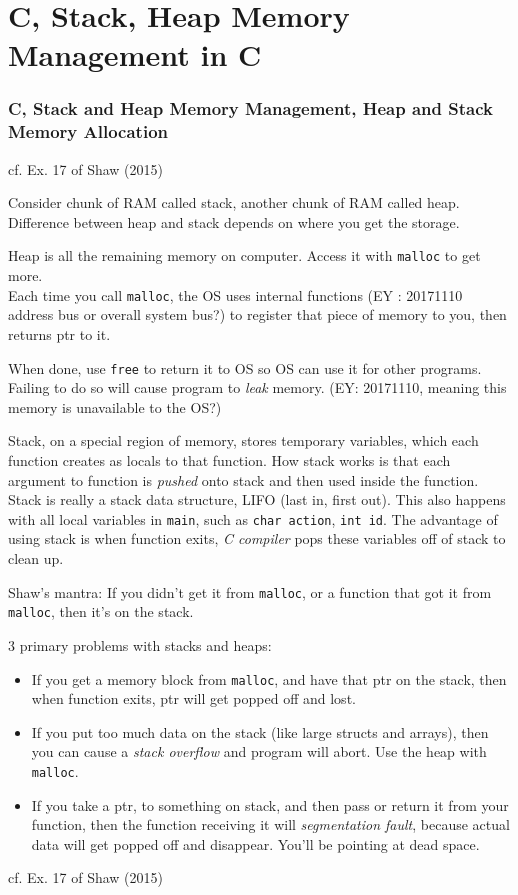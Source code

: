 \documentclass[10pt]{amsart}
\begin{document}
\part{C, Stack, Heap Memory Management in C}

\section{C, Stack and Heap Memory Management, Heap and Stack Memory Allocation}  


cf. Ex. 17 of Shaw (2015) \cite{Shaw2015}

Consider chunk of RAM called stack, another chunk of RAM called heap.  Difference between heap and stack depends on where you get the storage.  

Heap is all the remaining memory on computer.  Access it with \verb|malloc| to get more.  \\
Each time you call \verb|malloc|, the OS uses internal functions (EY : 20171110 address bus or overall system bus?) to register that piece of memory to you, then returns ptr to it.  

When done, use \verb|free| to return it to OS so OS can use it for other programs.  Failing to do so will cause program to \emph{leak} memory.  (EY: 20171110, meaning this memory is unavailable to the OS?)

Stack, on a special region of memory, stores temporary variables, which each function creates as locals to that function.  How stack works is that each argument to function is \emph{pushed} onto stack and then used inside the function.  Stack is really a stack data structure, LIFO (last in, first out).  This also happens with all local variables in \verb|main|, such as \verb|char action|, \verb|int id|.  The advantage of using stack is when function exits, \emph{C compiler} pops these variables off of stack to clean up.  

Shaw's mantra: If you didn't get it from \verb|malloc|, or a function that got it from \verb|malloc|, then it's on the stack.  

3 primary problems with stacks and heaps: 
\begin{itemize}
	\item If you get a memory block from \verb|malloc|, and have that ptr on the stack, then when function exits, ptr will get popped off and lost.  
	\item If you put too much data on the stack (like large structs and arrays), then you can cause a \emph{stack overflow} and program will abort.  Use the heap with \verb|malloc|.  
	\item If you take a ptr, to something on stack, and then pass or return it from your function, then the function receiving it will \emph{segmentation fault}, because actual data will get popped off and disappear.  You'll be pointing at dead space.  
\end{itemize}
cf. Ex. 17 of Shaw (2015) \cite{Shaw2015}
\end{document}
